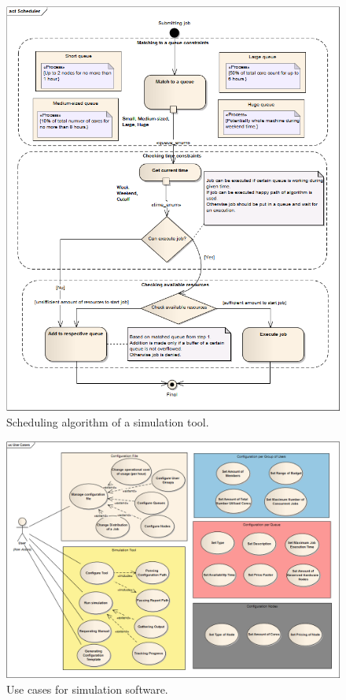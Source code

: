 \begin{appendices}
		\begin{figure}[!hbtp]
			\centering
			\includegraphics[width=\textwidth]{../ea_files/generatedImages/Simulator/Scheduler.png}
			\caption{Scheduling algorithm of a simulation tool.}
			\label{fig:scheduler}
		\end{figure}
	
		\begin{figure}[!hbtp]
			\centering
			\includegraphics[height=\textwidth, angle=90]{../ea_files/generatedImages/Simulator/UseCases.png}
			\caption{Use cases for simulation software.}
			\label{fig:use-cases}
		\end{figure}
\end{appendices}